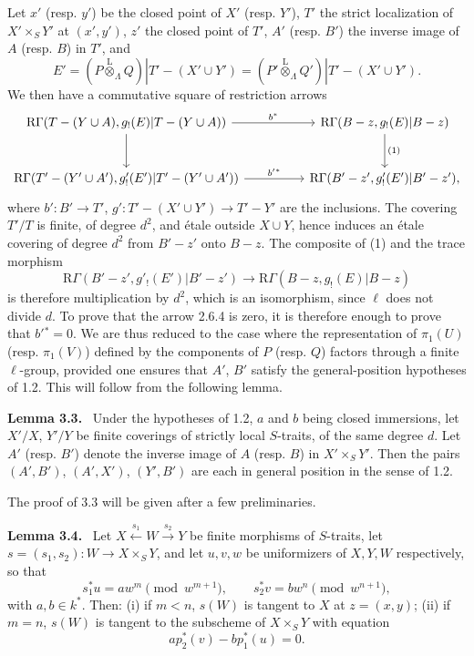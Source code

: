 \documentclass[11pt]{article}
\newenvironment{statement}[1]{\par\medskip\noindent\textbf{#1.}\ }{\par\medskip}
\providecommand{\lten}{\overset{\mathrm L}{\otimes}}
\begin{document}
Let $x'$ (resp. $y'$) be the closed point of $X'$ (resp. $Y'$), $T'$ the strict localization of $X'\times_S Y'$ at $(x',y')$, $z'$ the closed point of $T'$, $A'$ (resp. $B'$) the inverse image of $A$ (resp. $B$) in $T'$, and
\[
E'=(P\lten_{\Lambda}Q)|T'-(X'\cup Y')
   =(P'\lten_{\Lambda}Q')|T'-(X'\cup Y').
\]
We then have a commutative square of restriction arrows
\[
\begin{tikzcd}[column sep=huge,row sep=large]
\mathrm R\Gamma(T-(Y\cup A),g_!(E)|T-(Y\cup A))
 \arrow[r,"b^*"] \arrow[d]
&
\mathrm R\Gamma(B-z,g_!(E)|B-z) \arrow[d,"(1)"]\\
\mathrm R\Gamma(T'-(Y'\cup A'),g'_!(E')|T'-(Y'\cup A'))
 \arrow[r,"b'{}^*"]
&
\mathrm R\Gamma(B'-z',g'_!(E')|B'-z') ,
\end{tikzcd}
\]
where $b':B'\to T'$, $g':T'-(X'\cup Y')\to T'-Y'$ are the inclusions. The covering $T'/T$ is finite, of degree $d^2$, and étale outside $X\cup Y$, hence induces an étale covering of degree $d^2$ from $B'-z'$ onto $B-z$. The composite of (1) and the trace morphism
\[
\mathrm R\Gamma(B'-z',g'_!(E')|B'-z')
 \longrightarrow
\mathrm R\Gamma(B-z,g_!(E)|B-z)
\]
is therefore multiplication by $d^2$, which is an isomorphism, since $\ell$ does not divide $d$. To prove that the arrow 2.6.4 is zero, it is therefore enough to prove that $b'{}^*=0$. We are thus reduced to the case where the representation of $\pi_1(U)$ (resp. $\pi_1(V)$) defined by the components of $P$ (resp. $Q$) factors through a finite $\ell$-group, provided one ensures that $A'$, $B'$ satisfy the general-position hypotheses of 1.2. This will follow from the following lemma.

\begin{statement}{Lemma 3.3}
Under the hypotheses of 1.2, $a$ and $b$ being closed immersions, let $X'/X$, $Y'/Y$ be finite coverings of strictly local $S$-traits, of the same degree $d$. Let $A'$ (resp. $B'$) denote the inverse image of $A$ (resp. $B$) in $X'\times_S Y'$. Then the pairs $(A',B')$, $(A',X')$, $(Y',B')$ are each in general position in the sense of 1.2.
\end{statement}

The proof of 3.3 will be given after a few preliminaries.

\begin{statement}{Lemma 3.4}
Let $X\xleftarrow{s_1}W\xrightarrow{s_2}Y$ be finite morphisms of $S$-traits, let $s=(s_1,s_2):W\to X\times_SY$, and let $u,v,w$ be uniformizers of $X,Y,W$ respectively, so that
\[
s_1^*u=aw^m\pmod {w^{m+1}},\qquad
s_2^*v=bw^n\pmod {w^{n+1}},
\]
with $a,b\in k^*$. Then: (i) if $m<n$, $s(W)$ is tangent to $X$ at $z=(x,y)$; (ii) if $m=n$, $s(W)$ is tangent to the subscheme of $X\times_SY$ with equation
\[
ap_2^*(v)-bp_1^*(u)=0.
\]
\end{statement}
\end{document}
